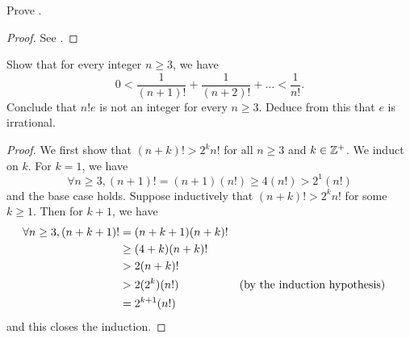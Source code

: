 \exercisesection

\begin{ex}\label{ii:ex:4.5.1}
  Prove .
\end{ex}

\begin{proof}
  See .
\end{proof}

\begin{ex}\label{ii:ex:4.5.2}
  Show that for every integer \(n \geq 3\), we have
  \[
    0 < \dfrac{1}{(n + 1)!} + \dfrac{1}{(n + 2)!} + \dots < \dfrac{1}{n!}.
  \]
  Conclude that \(n! e\) is not an integer for every \(n \geq 3\).
  Deduce from this that \(e\) is irrational.
\end{ex}

\begin{proof}
  We first show that \((n + k)! > 2^k n!\) for all \(n \geq 3\) and \(k \in \mathbb{Z}^+\).
  We induct on \(k\).
  For \(k = 1\), we have
  \[
    \forall n \geq 3, (n + 1)! = (n + 1) (n!) \geq 4 (n!) > 2^1 (n!)
  \]
  and the base case holds.
  Suppose inductively that \((n + k)! > 2^k n!\) for some \(k \geq 1\).
  Then for \(k + 1\), we have
  \begin{align*}
    \forall n \geq 3, (n + k + 1)! & = (n + k + 1) (n + k)!            \\
                                   & \geq (4 + k)(n + k)!              \\
                                   & > 2 (n + k)!                      \\
                                   & > 2 (2^k) (n!)         &  & \text{(by the induction hypothesis)} \\
                                   & = 2^{k + 1} (n!)
  \end{align*}
  and this closes the induction.


\end{proof}
